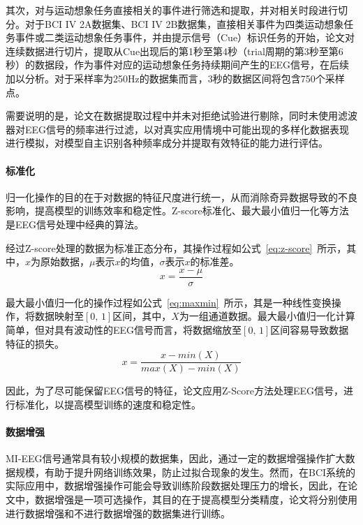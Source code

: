 其次，对与运动想象任务直接相关的事件进行筛选和提取，并对相关时段进行切分。对于BCI IV 2A数据集、BCI IV 2B数据集，直接相关事件为四类运动想象任务事件或二类运动想象任务事件，并由提示信号（Cue）标识任务的开始，论文对连续数据进行切片，提取从Cue出现后的第1秒至第4秒（trial周期的第3秒至第6秒）的数据段，作为事件对应的运动想象任务持续期间产生的EEG信号，在后续加以分析。对于采样率为250Hz的数据集而言，3秒的数据区间将包含750个采样点。

需要说明的是，论文在数据提取过程中并未对拒绝试验进行剔除，同时未使用滤波器对EEG信号的频率进行过滤，以对真实应用情境中可能出现的多样化数据表现进行模拟，对模型自主识别各种频率成分并提取有效特征的能力进行评估。

\paragraph{标准化}

归一化操作的目的在于对数据的特征尺度进行统一，从而消除奇异数据导致的不良影响，提高模型的训练效率和稳定性。Z-score标准化、最大最小值归一化等方法是EEG信号处理中经典的算法。

经过Z-score处理的数据为标准正态分布，其操作过程如公式~\ref{eq:z-score}~所示，其中，\(x\)为原始数据，\(\mu\)表示\(x\)的均值，\(\sigma\)表示\(x\)的标准差。
\begin{equation}
    x=\frac{x-\mu}{\sigma}
    \label{eq:z-score}
\end{equation}

最大最小值归一化的操作过程如公式~\ref{eq:maxmin}~所示，其是一种线性变换操作，将数据映射至\([0,\,1]\)区间，其中，\(X\)为一组通道数据。最大最小值归一化计算简单，但对具有波动性的EEG信号而言，将数据缩放至\([0,\,1]\)区间容易导致数据特征的损失。
\begin{equation}
    x=\frac{x-min(X)}{max(X)-min(X)}
    \label{eq:maxmin}
\end{equation}

因此，为了尽可能保留EEG信号的特征，论文应用Z-Score方法处理EEG信号，进行标准化，以提高模型训练的速度和稳定性。

\paragraph{数据增强}

MI-EEG信号通常具有较小规模的数据集，因此，通过一定的数据增强操作扩大数据规模，有助于提升网络训练效果，防止过拟合现象的发生。然而，在BCI系统的实际应用中，数据增强操作可能会导致训练阶段数据处理压力的增长，因此，在论文中，数据增强是一项可选操作，其目的在于提高模型分类精度，论文将分别使用进行数据增强和不进行数据增强的数据集进行训练。

